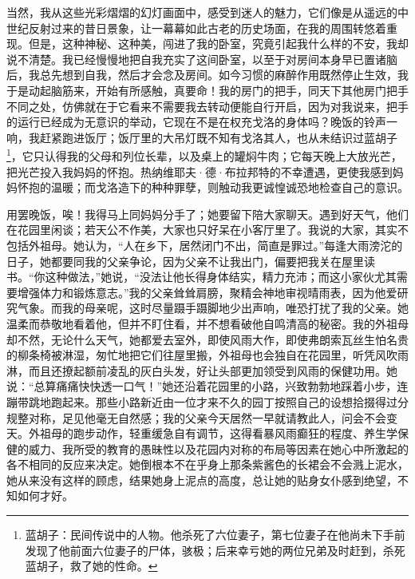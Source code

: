 \par 当然，我从这些光彩熠熠的幻灯画面中，感受到迷人的魅力，它们像是从遥远的中世纪反射过来的昔日景象，让一幕幕如此古老的历史场面，在我的周围转悠着重现。但是，这种神秘、这种美，闯进了我的卧室，究竟引起我什么样的不安，我却说不清楚。我已经慢慢地把自我充实了这间卧室，以至于对房间本身早已置诸脑后，我总先想到自我，然后才会念及房间。如今习惯的麻醉作用既然停止生效，我于是动起脑筋来，开始有所感触，真要命！我的房门的把手，同天下其他房门把手不同之处，仿佛就在于它看来不需要我去转动便能自行开启，因为对我说来，把手的运行已经成为无意识的举动，它现在不是在权充戈洛的身体吗？晚饭的铃声一响，我赶紧跑进饭厅；饭厅里的大吊灯既不知有戈洛其人，也从未结识过蓝胡子\footnote{蓝胡子：民间传说中的人物。他杀死了六位妻子，第七位妻子在他尚未下手前发现了他前面六位妻子的尸体，骇极；后来幸亏她的两位兄弟及时赶到，杀死蓝胡子，救了她的性命。}，它只认得我的父母和列位长辈，以及桌上的罐焖牛肉；它每天晚上大放光芒，把光芒投入我妈妈的怀抱。热纳维耶夫·德·布拉邦特的不幸遭遇，更使我感到妈妈怀抱的温暖；而戈洛造下的种种罪孽，则触动我更诚惶诚恐地检查自己的意识。
\par 用罢晚饭，唉！我得马上同妈妈分手了；她要留下陪大家聊天。遇到好天气，他们在花园里闲谈；若天公不作美，大家也只好呆在小客厅里了。我说的大家，其实不包括外祖母。她认为，“人在乡下，居然闭门不出，简直是罪过。”每逢大雨滂沱的日子，她都要同我的父亲争论，因为父亲不让我出门，偏要把我关在屋里读书。“你这种做法，”她说，“没法让他长得身体结实，精力充沛；而这小家伙尤其需要增强体力和锻炼意志。”我的父亲耸耸肩膀，聚精会神地审视晴雨表，因为他爱研究气象。而我的母亲呢，这时尽量蹑手蹑脚地少出声响，唯恐打扰了我的父亲。她温柔而恭敬地看着他，但并不盯住看，并不想看破他自鸣清高的秘密。我的外祖母却不然，无论什么天气，她都爱去室外，即使风雨大作，即使弗朗索瓦丝生怕名贵的柳条椅被淋湿，匆忙地把它们往屋里搬，外祖母也会独自在花园里，听凭风吹雨淋，而且还撩起额前凌乱的灰白头发，好让头部更加领受到风雨的保健功用。她说：“总算痛痛快快透一口气！”她还沿着花园里的小路，兴致勃勃地踩着小步，连蹦带跳地跑起来。那些小路新近由一位才来不久的园丁按照自己的设想拾掇得过分规整对称，足见他毫无自然感；我的父亲今天居然一早就请教此人，问会不会变天。外祖母的跑步动作，轻重缓急自有调节，这得看暴风雨癫狂的程度、养生学保健的威力、我所受的教育的愚昧性以及花园内对称的布局等因素在她心中所激起的各不相同的反应来决定。她倒根本不在乎身上那条紫酱色的长裙会不会溅上泥水，她从来没有这样的顾虑，结果她身上泥点的高度，总让她的贴身女仆感到绝望，不知如何才好。
